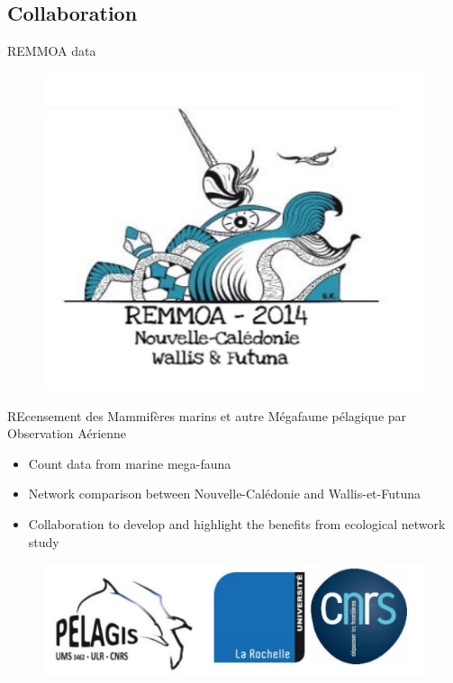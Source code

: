 \documentclass[9pt]{beamer}
\newcommand{\emphase}[1]{\textcolor{Complement}{#1}}
\begin{document}
\subsection{Collaboration}
\begin{frame}{REMMOA data}
\begin{figure}[htp]
\centering
\includegraphics[scale=0.2]{remmoa.png}
\end{figure}

\Large{
\emphase{RE}censement des \emphase{M}ammifères marins et autre \emphase{M}égafaune pélagique par \emphase{O}bservation \emphase{A}érienne}\\\bigskip
\normalsize{
\begin{itemize}
	\item Count data from marine mega-fauna
	\item Network comparison between Nouvelle-Calédonie and Wallis-et-Futuna
	\item Collaboration to develop and highlight the benefits from ecological network study \vspace{0.3cm}
\end{itemize}
}
\begin{figure}[htp]
\centering
\includegraphics[scale=0.3]{logoremmoa.png}
\caption{}
\label{}
\end{figure}

\end{frame}
\end{document}
